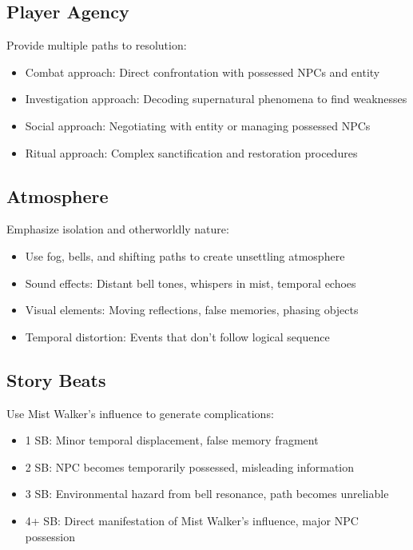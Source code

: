 \documentclass[11pt]{article}
\begin{document}
\subsection*{Player Agency}
Provide multiple paths to resolution:
\begin{itemize}
    \item Combat approach: Direct confrontation with possessed NPCs and entity
    \item Investigation approach: Decoding supernatural phenomena to find weaknesses
    \item Social approach: Negotiating with entity or managing possessed NPCs
    \item Ritual approach: Complex sanctification and restoration procedures
\end{itemize}

\subsection*{Atmosphere}
Emphasize isolation and otherworldly nature:
\begin{itemize}
    \item Use fog, bells, and shifting paths to create unsettling atmosphere
    \item Sound effects: Distant bell tones, whispers in mist, temporal echoes
    \item Visual elements: Moving reflections, false memories, phasing objects
    \item Temporal distortion: Events that don't follow logical sequence
\end{itemize}

\subsection*{Story Beats}
Use Mist Walker's influence to generate complications:
\begin{itemize}
    \item 1 SB: Minor temporal displacement, false memory fragment
    \item 2 SB: NPC becomes temporarily possessed, misleading information
    \item 3 SB: Environmental hazard from bell resonance, path becomes unreliable
    \item 4+ SB: Direct manifestation of Mist Walker's influence, major NPC possession
\end{itemize}
\end{document}
